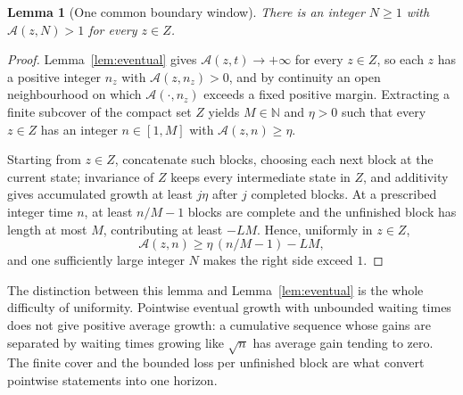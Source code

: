\documentclass[11pt,a4paper]{article}
\theoremstyle{plain}
\newtheorem{lemma}[theorem]{Lemma}
\theoremstyle{definition}
\theoremstyle{remark}
\newcommand{\N}{\mathbb N}
\newcommand{\cA}{\mathcal A}
\begin{document}
\begin{lemma}[One common boundary window]\label{lem:window}
There is an integer $N\ge1$ with $\cA(z,N)>1$ for every $z\in Z$.
\end{lemma}
\begin{proof}
Lemma~\ref{lem:eventual} gives $\cA(z,t)\to+\infty$ for every $z\in Z$, so each $z$ has a positive integer $n_z$ with $\cA(z,n_z)>0$, and by continuity an open neighbourhood on which $\cA(\cdot,n_z)$ exceeds a fixed positive margin. Extracting a finite subcover of the compact set $Z$ yields $M\in\N$ and $\eta>0$ such that every $z\in Z$ has an integer $n\in[1,M]$ with $\cA(z,n)\ge\eta$.

Starting from $z\in Z$, concatenate such blocks, choosing each next block at the current state; invariance of $Z$ keeps every intermediate state in $Z$, and additivity gives accumulated growth at least $j\eta$ after $j$ completed blocks. At a prescribed integer time $n$, at least $n/M-1$ blocks are complete and the unfinished block has length at most $M$, contributing at least $-LM$. Hence, uniformly in $z\in Z$,
\[
 \cA(z,n)\ge\eta\,(n/M-1)-LM,
\]
and one sufficiently large integer $N$ makes the right side exceed $1$.
\end{proof}

The distinction between this lemma and Lemma~\ref{lem:eventual} is the whole difficulty of uniformity. Pointwise eventual growth with unbounded waiting times does not give positive average growth: a cumulative sequence whose gains are separated by waiting times growing like $\sqrt n$ has average gain tending to zero. The finite cover and the bounded loss per unfinished block are what convert pointwise statements into one horizon.
\end{document}
